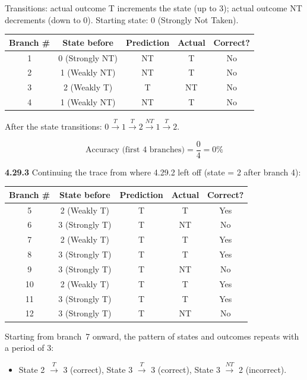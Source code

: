 Transitions: actual outcome T increments the state (up to 3); actual outcome
NT decrements (down to 0). Starting state: 0 (Strongly Not Taken).

\begin{center}
\begin{tabular}{ccccc}
\toprule
\textbf{Branch \#} & \textbf{State before} & \textbf{Prediction} &
  \textbf{Actual} & \textbf{Correct?} \\
\midrule
1 & 0 (Strongly NT) & NT & T  & No  \\
2 & 1 (Weakly NT)   & NT & T  & No  \\
3 & 2 (Weakly T)    & T  & NT & No  \\
4 & 1 (Weakly NT)   & NT & T  & No  \\
\bottomrule
\end{tabular}
\end{center}

After the state transitions: $0 \xrightarrow{T} 1 \xrightarrow{T} 2
\xrightarrow{NT} 1 \xrightarrow{T} 2$.

\[
  \text{Accuracy (first 4 branches)} = \frac{0}{4} = \boxed{0\%}
\]

\medskip\noindent\textbf{4.29.3}
Continuing the trace from where 4.29.2 left off (state = 2 after branch 4):

\begin{center}
\begin{tabular}{ccccc}
\toprule
\textbf{Branch \#} & \textbf{State before} & \textbf{Prediction} &
  \textbf{Actual} & \textbf{Correct?} \\
\midrule
5  & 2 (Weakly T)    & T & T  & Yes \\
6  & 3 (Strongly T)  & T & NT & No  \\
7  & 2 (Weakly T)    & T & T  & Yes \\
8  & 3 (Strongly T)  & T & T  & Yes \\
9  & 3 (Strongly T)  & T & NT & No  \\
10 & 2 (Weakly T)    & T & T  & Yes \\
11 & 3 (Strongly T)  & T & T  & Yes \\
12 & 3 (Strongly T)  & T & NT & No  \\
\bottomrule
\end{tabular}
\end{center}

Starting from branch~7 onward, the pattern of states and outcomes repeats
with a period of 3:
\begin{itemize}
  \item State 2 $\xrightarrow{T}$ 3 (correct), State 3 $\xrightarrow{T}$ 3
    (correct), State 3 $\xrightarrow{NT}$ 2 (incorrect).
\end{itemize}

